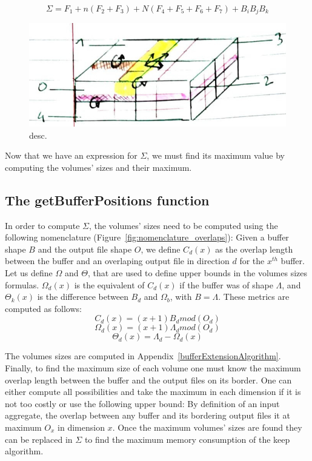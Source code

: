 \documentclass[conference]{IEEEtran}
\begin{document}
\begin{equation} \label{eq:2}
\Sigma = F_1 + n(F_2 + F_3) + N(F_4 + F_5 + F_6 + F_7) + B_iB_jB_k
\end{equation}

\begin{figure}[h]
\centering
\includegraphics[scale=0.3]{./figures/new/bufferextensionalgoformula.jpeg}
\caption{desc.}
\label{fig:calculmemoire}
\end{figure}

Now that we have an expression for $\Sigma$, we must find its maximum value by
computing the volumes' sizes and their maximum.

\subsection{The getBufferPositions function}

In order to compute $\Sigma$, the volumes' sizes need to be computed using the
following nomenclature (Figure~\ref{fig:nomenclature_overlaps}):
Given a buffer shape $B$ and the output file shape $O$, we define $C_d(x)$ as
the overlap length between the buffer and an overlaping output file in direction
$d$ for the $x^{th}$ buffer. Let us define $\Omega$ and $\Theta$, that are used
to define upper bounds in the volumes sizes formulas. $\Omega_d(x)$ is the
equivalent of $C_d(x)$ if the buffer was of shape $\Lambda$, and $\Theta_k(x)$
is the difference between $B_d$ and $\Omega_b$, with $B=\Lambda$.
These metrics are computed as follows:
$$C_d(x) = (x+1)B_d mod(O_d)$$
$$\Omega_d(x) = (x+1)\Lambda_d mod(O_d)$$
$$\Theta_d(x) = \Lambda_d - \Omega_d(x)$$

The volumes sizes are computed in Appendix~\ref{bufferExtensionAlgorithm}.
Finally, to find the maximum size
of each volume one must know the maximum overlap length between the buffer and
the output files on its border. One can either compute all possibilities and
take the maximum in each dimension if it is not too costly or use the following
upper bound: By definition of an input aggregate, the overlap between any buffer
and its bordering output files it at maximum $O_x$ in dimension $x$. Once the
maximum volumes' sizes are found they can be replaced in $\Sigma$ to find the
maximum memory consumption of the keep algorithm.
\end{document}
